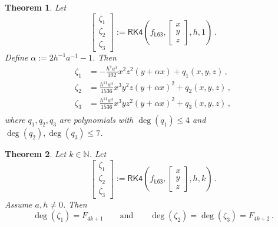 \documentclass[10pt,a4paper]{amsart}
\newtheorem{theorem}{Theorem}
\newcommand{\N}{\mathbb{N}}
\newcommand{\br}[1]{\lb #1 \rb} %
\newcommand{\brOf}[1]{\!\br{#1}} %
\newcommand{\eqcm}{\,,} %
\newcommand{\eqfs}{\,.}
\newcommand{\lb}{\left(} %
\newcommand{\rb}{\right)} %
\begin{document}
\begin{theorem}\label{thm:rk4l63:one}
	Let
	\begin{equation*}
		\begin{bmatrix}
			\zeta_{1}\\
			\zeta_{2}\\
			\zeta_{3}
		\end{bmatrix}
		:=
		\mathsf{RK4}\brOf{f_{\mathsf{L63}}, \begin{bmatrix}
				x\\
				y\\
				z
			\end{bmatrix}, h, 1}
		\eqfs
	\end{equation*}
	Define $\alpha := 2h^{-1}a^{-1} - 1$.
	Then
	\begin{align*}
		\zeta_{1} &= -\frac{h^7a^3}{192}x^2z^2(y+\alpha x) + q_1(x,y,z)\eqcm\\
		\zeta_{2} &= \frac{h^{11}a^4}{1536}x^3y^2z(y+\alpha x)^2 + q_2(x,y,z)\eqcm\\
		\zeta_{3} &= \frac{h^{11}a^4}{1536}x^3yz^2(y+\alpha x)^2 + q_3(x,y,z)\eqcm\\
	\end{align*}
	where $q_1, q_2, q_3$ are polynomials with $\deg(q_1) \leq 4$ and $\deg(q_2), \deg(q_3) \leq 7$.
\end{theorem}

\begin{theorem}
	Let $k \in \N$.
	Let
	\begin{equation*}
		\begin{bmatrix}
			\zeta_1\\
			\zeta_2\\
			\zeta_3
		\end{bmatrix}
		:=
		\mathsf{RK4}\brOf{f_{\mathsf{L63}}, \begin{bmatrix}
				x\\
				y\\
				z
			\end{bmatrix}, h, k}
		\eqfs
	\end{equation*}
	Assume $a,h\neq 0$.
	Then
	\begin{equation*}
		\deg(\zeta_1) = F_{4k+1}
		\qquad\text{and}\qquad
		\deg(\zeta_2) = \deg(\zeta_3) = F_{4k+2}
		\eqfs
	\end{equation*}
\end{theorem}
\end{document}
